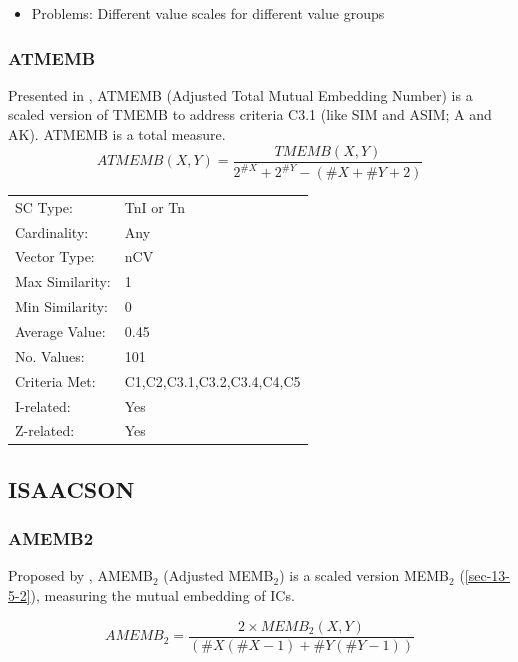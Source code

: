 \documentclass{article}
\begin{document}
\begin{itemize}
\item Problems: Different value scales for different value groups
\end{itemize}
\subsubsection{ATMEMB}
\label{sec-13-5-4}

Presented in \citet[pp. 494]{Rahn1979}, ATMEMB (Adjusted Total Mutual
Embedding Number) is a scaled version of TMEMB to address criteria
C3.1 (like SIM and ASIM; A and AK). ATMEMB is a total measure.
$$ATMEMB\left(X,Y\right)=\frac{TMEMB\left(X,Y\right)}{2^{\#X}+2^{\#Y}-\left(\#X+\#Y+2\right)}$$

\begin{center}
\begin{tabular}{ll}
 SC Type:         &  TnI or Tn                   \\
 Cardinality:     &  Any                         \\
 Vector Type:     &  nCV                         \\
 Max Similarity:  &  1                           \\
 Min Similarity:  &  0                           \\
 Average Value:   &  0.45                        \\
 No. Values:      &  101                         \\
 Criteria Met:    &  C1,C2,C3.1,C3.2,C3.4,C4,C5  \\
 I-related:       &  Yes                         \\
 Z-related:       &  Yes                         \\
\end{tabular}
\end{center}
\subsection{ISAACSON}
\label{sec-13-6}
\subsubsection{AMEMB2}
\label{sec-13-6-1}

Proposed by \citet[pp. 8]{Isaacson1990}, AMEMB$_{2}$ (Adjusted MEMB$_{2}$)
is a scaled version MEMB$_{2}$ (\ref{sec-13-5-2}), measuring the mutual
embedding of ICs.

$$AMEMB_{2}=\frac{2 \times
MEMB_{2}(X,Y)}{\left(\#X\left(\#X-1\right)+\#Y\left(\#Y-1\right)\right)}$$
\end{document}
